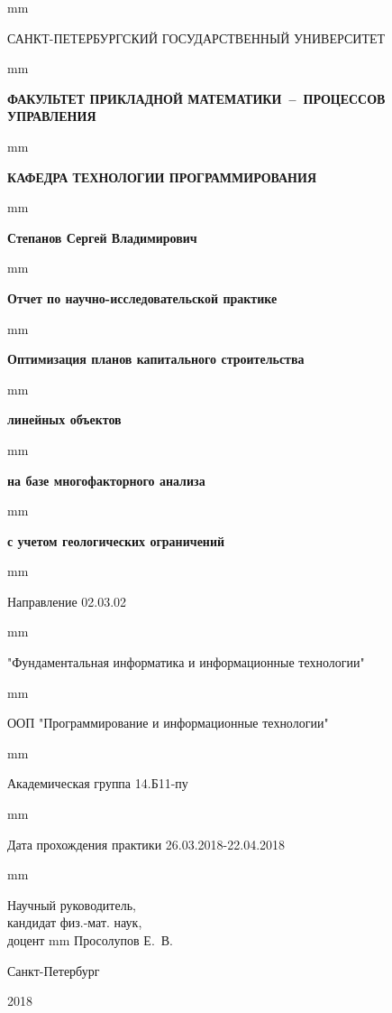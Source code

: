 \thispagestyle{empty}  mm
\centerline{{САНКТ-ПЕТЕРБУРГСКИЙ ГОСУДАРСТВЕННЫЙ
УНИВЕРСИТЕТ}}  mm
\centerline{\bf{ФАКУЛЬТЕТ ПРИКЛАДНОЙ МАТЕМАТИКИ~--~ПРОЦЕССОВ УПРАВЛЕНИЯ}}  mm
\centerline{\bf{КАФЕДРА ТЕХНОЛОГИИ ПРОГРАММИРОВАНИЯ}}
 mm \centerline{\LARGE\bf{Степанов Сергей Владимирович}}
 mm \centerline{\LARGE\bf{Отчет по научно-исследовательской практике}}  mm
\centerline{\LARGE\bf{Оптимизация планов капитального строительства}}  mm
\centerline{\LARGE\bf{линейных объектов}}  mm
\centerline{\LARGE\bf{на базе многофакторного анализа}}  mm
\centerline{\LARGE\bf{с учетом геологических ограничений}}  mm
\centerline{\large Направление 02.03.02}  mm
\centerline{\large "Фундаментальная информатика и информационные технологии"}  mm
\centerline{\large ООП "Программирование и информационные технологии"}  mm
\centerline{\large Академическая группа 14.Б11-пу}  mm
\centerline{\large Дата прохождения практики 26.03.2018-22.04.2018}  mm
\large{
\noindent
Научный руководитель,\\
кандидат физ.-мат. наук,\\
доцент  mm Просолупов Е.~В.\\
\vfill \hfil \break
\centerline{\large Санкт-Петербург } \centerline{ 2018 }}
\newpage
